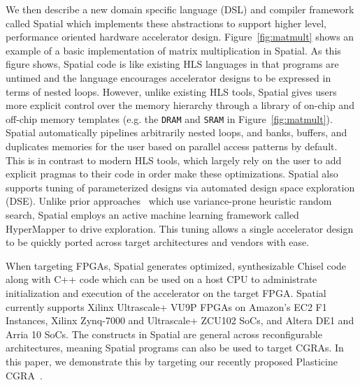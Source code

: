 We then describe a new domain specific language (DSL) and compiler framework called Spatial which implements these abstractions to support higher level, performance oriented hardware accelerator design. 
Figure~\ref{fig:matmult} shows an example of a basic implementation of matrix multiplication in Spatial.
As this figure shows, Spatial code is like existing HLS languages in that programs are untimed and the language encourages accelerator designs to be expressed in terms of nested loops. However, unlike existing HLS tools, Spatial gives users more explicit control over the memory hierarchy through a library of on-chip and off-chip memory templates (e.g. the \texttt{DRAM} and \texttt{SRAM} in Figure~\ref{fig:matmult}).
Spatial automatically pipelines arbitrarily nested loops, and banks, buffers, and duplicates memories for the user based on parallel access patterns by default. 
This is in contrast to modern HLS tools, which largely rely on the user to add explicit pragmas to their code in order make these optimizations.
Spatial also supports tuning of parameterized designs via automated design space exploration (DSE).
Unlike prior approaches~\cite{dhdl} which use variance-prone heuristic random search, Spatial employs an active machine learning framework called HyperMapper \cite{Bodin2016:PACT16} to drive exploration.
This tuning allows a single accelerator design to be quickly ported across target architectures and vendors with ease.

When targeting FPGAs, Spatial generates optimized, synthesizable Chisel code along with C++ code which can be used on a host CPU to administrate initialization and execution of the accelerator on the target FPGA. 
Spatial currently supports Xilinx Ultrascale+ VU9P FPGAs on Amazon's EC2 F1 Instances, Xilinx Zynq-7000 and Ultrascale+ ZCU102 SoCs, and Altera DE1 and Arria 10 SoCs.
The constructs in Spatial are general across reconfigurable architectures, meaning Spatial programs can also be used to target CGRAs. In this paper, we demonstrate this by targeting our recently proposed Plasticine CGRA~\cite{plasticine}.







